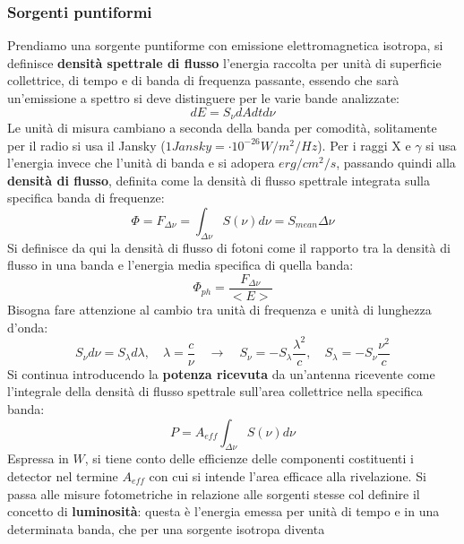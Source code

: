 \documentclass[a4paper,twoside,openany,notitlepage]{book}
\newcommand{\e}[1]{\cdot 10^{#1}}
\theoremstyle{definition}
\theoremstyle{plain}
\begin{document}
\subsubsection*{Sorgenti puntiformi}
Prendiamo una sorgente puntiforme con emissione elettromagnetica isotropa, si definisce \textbf{densità spettrale di flusso} l'energia raccolta per unità di superficie collettrice, di tempo e di banda di frequenza passante, essendo che sarà un'emissione a spettro si deve distinguere per le varie bande analizzate:
\begin{equation*}
	dE=S_\nu dAdtd\nu
\end{equation*}
Le unità di misura cambiano a seconda della banda per comodità, solitamente per il radio si usa il Jansky ($1 Jansky = \e{-26} W/m^2/Hz$). Per i raggi X e $\gamma$ si usa l'energia invece che l'unità di banda e si adopera $erg/cm^2/s$, passando quindi alla \textbf{densità di flusso}, definita come la densità di flusso spettrale integrata sulla specifica banda di frequenze:
\begin{equation*}
	\Phi=F_{\Delta\nu}=\int_{\Delta\nu}^{}S(\nu)d\nu = S_{mean}\Delta\nu
\end{equation*}
Si definisce da qui la densità di flusso di fotoni come il rapporto tra la densità di flusso in una banda e l'energia media specifica di quella banda:
\begin{equation*}
	\Phi_{ph}=\frac{F_{\Delta\nu}}{<E>}
\end{equation*}
Bisogna fare attenzione al cambio tra unità di frequenza e unità di lunghezza d'onda:
\begin{equation*}
	S_\nu d\nu = S_\lambda d\lambda, \quad \lambda=\frac{c}{\nu} \quad \longrightarrow \quad
	S_\nu = -S_\lambda \frac{\lambda^2}{c}, \quad S_\lambda = -S_\nu \frac{\nu^2}{c}
\end{equation*}
Si continua introducendo la \textbf{potenza ricevuta} da un'antenna ricevente come l'integrale della densità di flusso spettrale sull'area collettrice nella specifica banda:
\begin{equation*}
	P=A_{eff}\int_{\Delta \nu}^{} S(\nu)d\nu
\end{equation*}
Espressa in $W$, si tiene conto delle efficienze delle componenti costituenti i detector nel termine $A_{eff}$ con cui si intende l'area efficace alla rivelazione.
Si passa alle misure fotometriche in relazione alle sorgenti stesse col definire il concetto di \textbf{luminosità}: questa è l'energia emessa per unità di tempo e in una determinata banda, che per una sorgente isotropa diventa
\end{document}
